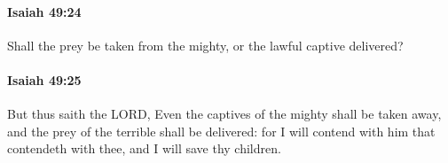 		\paragraph{Isaiah 49:24} %
			\label{ISAIAH-49-24}

			Shall the prey be taken from the mighty, or the lawful captive delivered?


		\paragraph{Isaiah 49:25} %
			\label{ISAIAH-49-25}

			But thus saith the LORD, Even the captives of the mighty shall be taken away, and the prey of the terrible shall be delivered: for I will contend with him that contendeth with thee, and I will save thy children.


